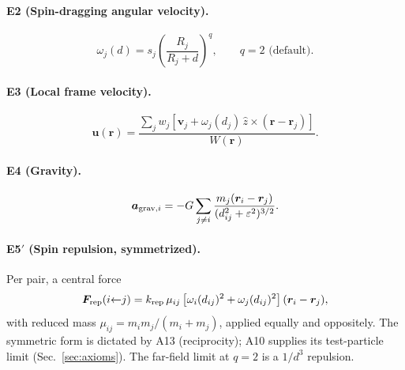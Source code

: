 \documentclass[aps,reprint,amsmath,amssymb,nofootinbib,superscriptaddress,floatfix]{revtex4-2}
\newcommand{\vect}[1]{\bm{#1}}
\begin{document}
\paragraph*{E2 (Spin-dragging angular velocity).}
\begin{equation}
\omega_j(d) = s_j\left(\frac{R_j}{R_j+d}\right)^{q},\qquad
q = 2 \text{ (default)}.
\label{eq:E2}
\end{equation}

\paragraph*{E3 (Local frame velocity).}
\begin{equation}
\vect{u}(\vect{r}) =
\frac{\sum_j w_j\left[\vect{v}_j
 + \omega_j(d_j)\,\hat{z}\times(\vect{r}-\vect{r}_j)\right]}
{W(\vect{r})}.
\label{eq:E3}
\end{equation}

\paragraph*{E4 (Gravity).}
\begin{equation}
\vect{a}_{{\rm grav},i} =
 -G\sum_{j\ne i} \frac{m_j(\vect{r}_i-\vect{r}_j)}
 {(d_{ij}^2+\varepsilon^2)^{3/2}}.
\label{eq:E4}
\end{equation}

\paragraph*{E5$'$ (Spin repulsion, symmetrized).}
Per pair, a central force
\begin{equation}
\vect{F}_{{\rm rep}}(i{\leftarrow}j) =
 k_{\rm rep}\,\mu_{ij}
 \left[\omega_i(d_{ij})^2+\omega_j(d_{ij})^2\right]
 (\vect{r}_i-\vect{r}_j),
\label{eq:E5}
\end{equation}
with reduced mass $\mu_{ij} = m_im_j/(m_i+m_j)$, applied equally and
oppositely.
The symmetric form is dictated by A13 (reciprocity); A10 supplies its
test-particle limit (Sec.~\ref{sec:axioms}).
The far-field limit at $q=2$ is a $1/d^3$ repulsion.
\end{document}
